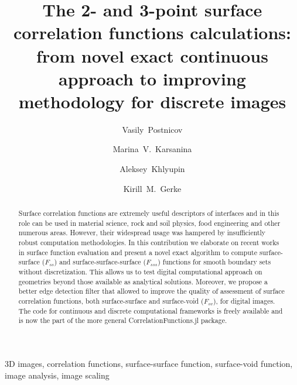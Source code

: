 \documentclass[preprint]{elsarticle}
\begin{document}
\author[Smith]{Vasily~Postnicov}
\author[Smith]{Marina~V.~Karsanina}
\author[Smith,MIT]{Aleksey~Khlyupin}
\author[Smith]{Kirill~M.~Gerke}

\address[Smith]{Schmidt Institute of Physics of the Earth of Russian Academy of
  Sciences, Moscow, 107031, Russia}
\address[MIT]{Moscow Institute of Physics and Technology,
  Dolgoprudny, 141701, Russia}

\title{The 2- and 3-point surface correlation functions calculations: from novel
  exact continuous approach to improving methodology for discrete images}

\begin{abstract}
  Surface correlation functions are extremely useful descriptors of interfaces
  and in this role can be used in material science, rock and soil physics, food
  engineering and other numerous areas. However, their widespread usage was
  hampered by insufficiently robust computation methodologies. In this
  contribution we elaborate on recent works in surface function evaluation and
  present a novel exact algorithm to compute surface-surface ($F_{ss}$) and
  surface-surface-surface ($F_{sss}$) functions for smooth boundary sets without
  discretization. This allows us to test digital computational approach on
  geometries beyond those available as analytical solutions. Moreover, we
  propose a better edge detection filter that allowed to improve the quality of
  assessment of surface correlation functions, both surface-surface and
  surface-void ($F_{sv}$), for digital images. The code for continuous and
  discrete computational frameworks is freely available and is now the part of
  the more general CorrelationFunctions.jl package.
\end{abstract}

\begin{keyword}
  3D images, correlation functions, surface-surface function, surface-void
  function, image analysis, image scaling
\end{keyword}

\maketitle
\end{document}
